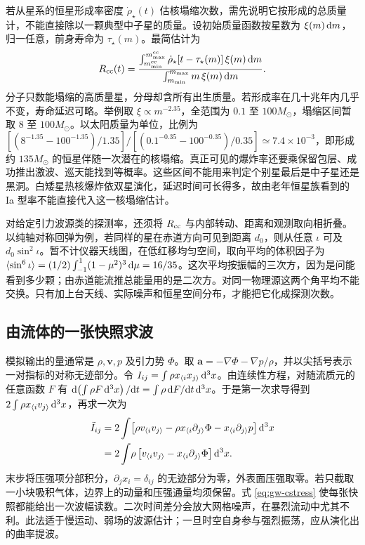 若从星系的恒星形成率密度 $\dot\rho_\star(t)$ 估核塌缩次数，需先说明它按形成的总质量计，不能直接除以一颗典型中子星的质量。设初始质量函数按星数为 $\xi(m)\,\dd m$，归一任意，前身寿命为 $\tau_\star(m)$。最简估计为
\[
 R_{\rm cc}(t)=
  \frac{\int_{m_{\rm min}^{\rm cc}}^{m_{\rm max}^{\rm cc}}
   \dot\rho_\star[t-\tau_\star(m)]\,\xi(m)\,\dd m}
       {\int_{m_{\rm min}}^{m_{\rm max}}m\,\xi(m)\,\dd m}.
\]
分子只数能塌缩的高质量星，分母却含所有出生质量。若形成率在几十兆年内几乎不变，寿命延迟可略。举例取 $\xi\propto m^{-2.35}$，全范围为 $0.1$ 至 $100M_\odot$，塌缩区间暂取 $8$ 至 $100M_\odot$。以太阳质量为单位，比例为 $[(8^{-1.35}-100^{-1.35})/1.35]/[(0.1^{-0.35}-100^{-0.35})/0.35]\simeq7.4\times10^{-3}$，即形成约 $135M_\odot$ 的恒星伴随一次潜在的核塌缩。真正可见的爆炸率还要乘保留包层、成功推出激波、巡天能找到等概率。这些区间不能用来判定个别星最后是中子星还是黑洞。白矮星热核爆炸依双星演化，延迟时间可长得多，故由老年恒星族看到的 Ia 型率不能直接代入这一核塌缩估计。

对给定引力波源类的探测率，还须将 $R_{\rm cc}$ 与内部转动、距离和观测取向相折叠。以纯轴对称回弹为例，若同样的星在赤道方向可见到距离 $d_0$，则从任意 $\iota$ 可及 $d_0\sin^2\iota$。暂不计仪器天线图，在低红移均匀空间，取向平均的体积因子为 $\langle\sin^6\iota\rangle=(1/2)\int_{-1}^1(1-\mu^2)^3\,\dd\mu=16/35$。这次平均按振幅的三次方，因为是问能看到多少颗；由赤道能流推总能量用的是二次方。对同一物理源这两个角平均不能交换。只有加上台天线、实际噪声和恒星空间分布，才能把它化成探测次数。

\subsection{由流体的一张快照求波}

模拟输出的量通常是 $\rho,\bm v,p$ 及引力势 $\Phi$。取 $\bm a=-\nabla\Phi-\nabla p/\rho$，并以尖括号表示一对指标的对称无迹部分。令 $I_{ij}=\int\rho x_{\langle i}x_{j\rangle}\,\dd^3x$。由连续性方程，对随流质元的任意函数 $F$ 有 $\dd(\int\rho F\,\dd^3x)/\dd t=\int\rho\,\dd F/\dd t\,\dd^3x$。于是第一次求导得到 $2\int\rho x_{\langle i}v_{j\rangle}\,\dd^3x$，再求一次为
\begin{align}
 \ddot I_{ij}
 &=2\int\!\left[\rho v_{\langle i}v_{j\rangle}
 -\rho x_{\langle i}\partial_{j\rangle}\Phi
 -x_{\langle i}\partial_{j\rangle}p\right]\dd^3x \notag\\
 &=2\int\!\rho\left[v_{\langle i}v_{j\rangle}
                  -x_{\langle i}\partial_{j\rangle}\Phi\right]\dd^3x .
 \label{eq:gw-cstress}
\end{align}
末步将压强项分部积分，$\partial_jx_i=\delta_{ij}$ 的无迹部分为零，外表面压强取零。若只截取一小块吸积气体，边界上的动量和压强通量均须保留。式 \eqref{eq:gw-cstress} 使每张快照都能给出一次波幅读数。二次时间差分会放大网格噪声，在暴烈流动中尤其不利。此法适于慢运动、弱场的波源估计；一旦时空自身参与强烈振荡，应从演化出的曲率提波。

